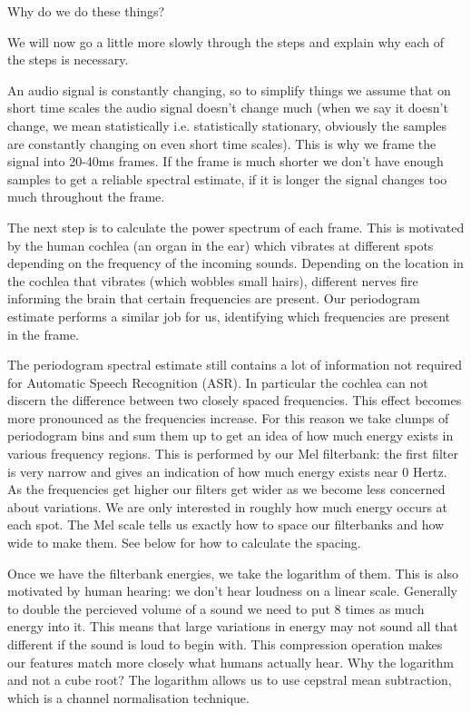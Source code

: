 Why do we do these things?

We will now go a little more slowly through the steps and explain why each of the steps is necessary.

An audio signal is constantly changing, so to simplify things we assume that on short time scales the audio signal doesn't change much (when we say it doesn't change, we mean statistically i.e. statistically stationary, obviously the samples are constantly changing on even short time scales). This is why we frame the signal into 20-40ms frames. If the frame is much shorter we don't have enough samples to get a reliable spectral estimate, if it is longer the signal changes too much throughout the frame.

The next step is to calculate the power spectrum of each frame. This is motivated by the human cochlea (an organ in the ear) which vibrates at different spots depending on the frequency of the incoming sounds. Depending on the location in the cochlea that vibrates (which wobbles small hairs), different nerves fire informing the brain that certain frequencies are present. Our periodogram estimate performs a similar job for us, identifying which frequencies are present in the frame.

The periodogram spectral estimate still contains a lot of information not required for Automatic Speech Recognition (ASR). In particular the cochlea can not discern the difference between two closely spaced frequencies. This effect becomes more pronounced as the frequencies increase. For this reason we take clumps of periodogram bins and sum them up to get an idea of how much energy exists in various frequency regions. This is performed by our Mel filterbank: the first filter is very narrow and gives an indication of how much energy exists near 0 Hertz. As the frequencies get higher our filters get wider as we become less concerned about variations. We are only interested in roughly how much energy occurs at each spot. The Mel scale tells us exactly how to space our filterbanks and how wide to make them. See below for how to calculate the spacing.

Once we have the filterbank energies, we take the logarithm of them. This is also motivated by human hearing: we don't hear loudness on a linear scale. Generally to double the percieved volume of a sound we need to put 8 times as much energy into it. This means that large variations in energy may not sound all that different if the sound is loud to begin with. This compression operation makes our features match more closely what humans actually hear. Why the logarithm and not a cube root? The logarithm allows us to use cepstral mean subtraction, which is a channel normalisation technique.

